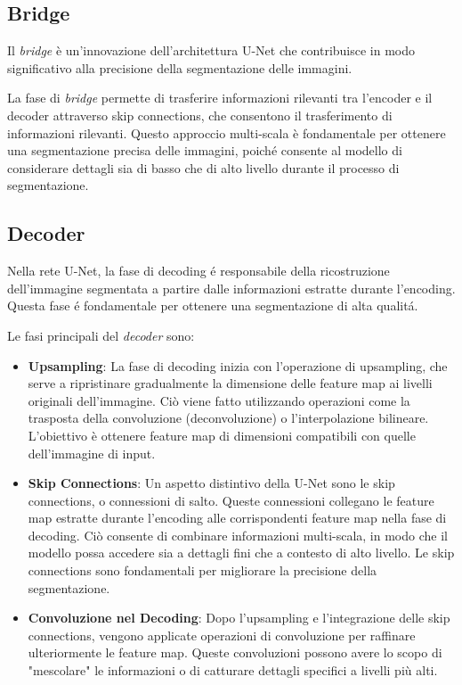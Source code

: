 




\subsection{Bridge} %
\label{sec:Bridge}

Il \textit{bridge} è un'innovazione dell'architettura U-Net che contribuisce in modo significativo alla precisione della segmentazione delle immagini.

La fase di \textit{bridge} permette di trasferire informazioni rilevanti tra l'encoder e il decoder attraverso skip connections, che consentono il trasferimento di informazioni rilevanti. Questo approccio multi-scala è fondamentale per ottenere una segmentazione precisa delle immagini, poiché consente al modello di considerare dettagli sia di basso che di alto livello durante il processo di segmentazione.




\subsection{Decoder} %
\label{sec:Decoder}

Nella rete U-Net, la fase di decoding \'e responsabile della ricostruzione dell'immagine segmentata a partire dalle informazioni estratte durante l'encoding. Questa fase \'e fondamentale per ottenere una segmentazione di alta qualit\'a.

Le fasi principali del \textit{decoder} sono:
\begin{itemize}
  \item \textbf{Upsampling}: La fase di decoding inizia con l'operazione di upsampling, che serve a ripristinare gradualmente la dimensione delle feature map ai livelli originali dell'immagine. Ciò viene fatto utilizzando operazioni come la trasposta della convoluzione (deconvoluzione) o l'interpolazione bilineare. L'obiettivo è ottenere feature map di dimensioni compatibili con quelle dell'immagine di input.
  \item \textbf{Skip Connections}: Un aspetto distintivo della U-Net sono le skip connections, o connessioni di salto. Queste connessioni collegano le feature map estratte durante l'encoding alle corrispondenti feature map nella fase di decoding. Ciò consente di combinare informazioni multi-scala, in modo che il modello possa accedere sia a dettagli fini che a contesto di alto livello. Le skip connections sono fondamentali per migliorare la precisione della segmentazione.
  \item \textbf{Convoluzione nel Decoding}: Dopo l'upsampling e l'integrazione delle skip connections, vengono applicate operazioni di convoluzione per raffinare ulteriormente le feature map. Queste convoluzioni possono avere lo scopo di "mescolare" le informazioni o di catturare dettagli specifici a livelli più alti.
\end{itemize}

